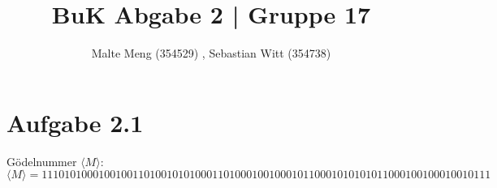 \documentclass{article}
\title{BuK Abgabe 2 | Gruppe 17}
\author{Malte Meng (354529) , Sebastian Witt (354738)}
\begin{document}
	\maketitle 
	\section[a 2.1]{Aufgabe 2.1}
	Gödelnummer $\langle M\rangle$:\\
	$\langle M\rangle = 111 0101000100100 11 010010101000 11 01000100100010 11 00010101010 11 000100100010010 111 $
\end{document}
